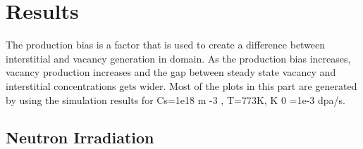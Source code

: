 \documentclass[a4paper]{article}
\begin{document}
\section{Results} \hspace{10pt}

The production bias is a factor that is used to create a difference between interstitial
and vacancy generation in domain. As the production bias increases, vacancy production
increases and the gap between steady state vacancy and interstitial concentrations gets wider.
Most of the plots in this part are generated by using the simulation results for Cs=1e18 m -3 ,
T=773K, K 0 =1e-3 dpa/s.

  \subsection{Neutron Irradiation}
\end{document}
